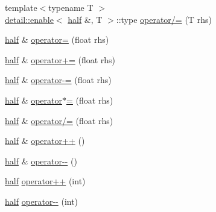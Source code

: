 \begin{DoxyCompactItemize}
\item 
{\footnotesize template$<$typename T $>$ }\\\hyperlink{structhalf__float_1_1detail_1_1enable}{detail\+::enable}$<$ \hyperlink{classhalf__float_1_1half}{half} \&, T $>$\+::type \hyperlink{classhalf__float_1_1half_a7a3a8659d8186e9cb14638907c664aa9}{operator/=} (T rhs)
\item 
\hyperlink{classhalf__float_1_1half}{half} \& \hyperlink{classhalf__float_1_1half_a3baf11c1e7ab4f825f182a801d85369a}{operator=} (float rhs)
\item 
\hyperlink{classhalf__float_1_1half}{half} \& \hyperlink{classhalf__float_1_1half_a91d580c2fea1b3a7b285341b79874333}{operator+=} (float rhs)
\item 
\hyperlink{classhalf__float_1_1half}{half} \& \hyperlink{classhalf__float_1_1half_a394f8eec9a67b4577584f994c7c3cb90}{operator-\/=} (float rhs)
\item 
\hyperlink{classhalf__float_1_1half}{half} \& \hyperlink{classhalf__float_1_1half_ab384d4ffe5c7117d1485f514f1113b50}{operator$\ast$=} (float rhs)
\item 
\hyperlink{classhalf__float_1_1half}{half} \& \hyperlink{classhalf__float_1_1half_a4a164803ca231d07f3b27c5c2bcf1715}{operator/=} (float rhs)
\item 
\hyperlink{classhalf__float_1_1half}{half} \& \hyperlink{classhalf__float_1_1half_ad902e63995af7942b1e498eb381dcdd9}{operator++} ()
\item 
\hyperlink{classhalf__float_1_1half}{half} \& \hyperlink{classhalf__float_1_1half_a3f6f801be0522edc5ae5146012748e5d}{operator-\/-\/} ()
\item 
\hyperlink{classhalf__float_1_1half}{half} \hyperlink{classhalf__float_1_1half_a1a88e6a51b683bb7f3c57997d73561ed}{operator++} (int)
\item 
\hyperlink{classhalf__float_1_1half}{half} \hyperlink{classhalf__float_1_1half_ae89579e80863e11ad9aae90e7883d4cd}{operator-\/-\/} (int)
\end{DoxyCompactItemize}

